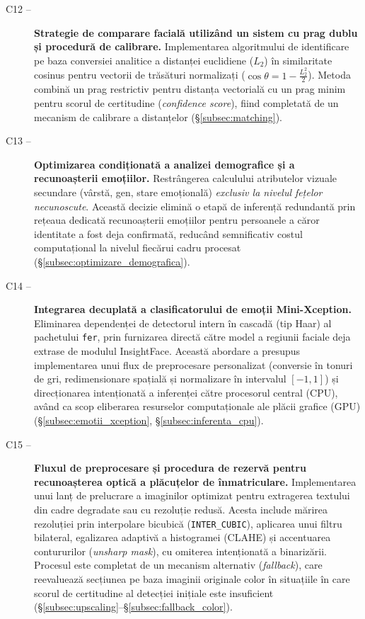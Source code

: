 \documentclass[../../main.tex]{subfiles}
\begin{document}
\begin{description}
	\item[C12 --] \textbf{Strategie de comparare facială utilizând un sistem cu prag dublu și procedură de calibrare.} Implementarea algoritmului de identificare pe baza conversiei analitice a distanței euclidiene ($L_2$) în similaritate cosinus pentru vectorii de trăsături normalizați ($\cos\theta = 1 - \frac{L_2^2}{2}$). Metoda combină un prag restrictiv pentru distanța vectorială cu un prag minim pentru scorul de certitudine (\textit{confidence score}), fiind completată de un mecanism de calibrare a distanțelor (\S\ref{subsec:matching}).

	\item[C13 --] \textbf{Optimizarea condiționată a analizei demografice și a recunoașterii emoțiilor.} Restrângerea calculului atributelor vizuale secundare (vârstă, gen, stare emoțională) \emph{exclusiv la nivelul fețelor necunoscute}. Această decizie elimină o etapă de inferență redundantă prin rețeaua dedicată recunoașterii emoțiilor pentru persoanele a căror identitate a fost deja confirmată, reducând semnificativ costul computațional la nivelul fiecărui cadru procesat (\S\ref{subsec:optimizare_demografica}).

	\item[C14 --] \textbf{Integrarea decuplată a clasificatorului de emoții Mini-Xception.} Eliminarea dependenței de detectorul intern în cascadă (tip Haar) al pachetului \texttt{fer}, prin furnizarea directă către model a regiunii faciale deja extrase de modulul InsightFace. Această abordare a presupus implementarea unui flux de preprocesare personalizat (conversie în tonuri de gri, redimensionare spațială și normalizare în intervalul $[-1, 1]$) și direcționarea intenționată a inferenței către procesorul central (CPU), având ca scop eliberarea resurselor computaționale ale plăcii grafice (GPU) (\S\ref{subsec:emotii_xception}, \S\ref{subsec:inferenta_cpu}).

	\item[C15 --] \textbf{Fluxul de preprocesare și procedura de rezervă pentru recunoașterea optică a plăcuțelor de înmatriculare.} Implementarea unui lanț de prelucrare a imaginilor optimizat pentru extragerea textului din cadre degradate sau cu rezoluție redusă. Acesta include mărirea rezoluției prin interpolare bicubică (\texttt{INTER\_CUBIC}), aplicarea unui filtru bilateral, egalizarea adaptivă a histogramei (CLAHE) și accentuarea contururilor (\textit{unsharp mask}), cu omiterea intenționată a binarizării. Procesul este completat de un mecanism alternativ (\textit{fallback}), care reevaluează secțiunea pe baza imaginii originale color în situațiile în care scorul de certitudine al detecției inițiale este insuficient (\S\ref{subsec:upscaling}--\S\ref{subsec:fallback_color}).


\end{description}
\end{document}
